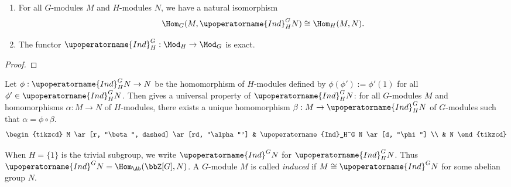   \begin{lemma}
    \begin{enumerate}
      \item For all $G$-modules $M$ and $H$-modules $N$, we have a natural isomorphism
      \[ \Hom_{G}(M, \upoperatorname{Ind}_H^G N) \cong \Hom_{H}(M, N). \]
      \item The functor $\upoperatorname{Ind}_H^G: \Mod_H \to \Mod_G$ is exact.
    \end{enumerate}
  \end{lemma}
  \begin{proof}

  \end{proof}

  Let $\phi: \upoperatorname{Ind}_H^G N \to N$ be the homomorphism of $H$-modules defined by $\phi(\phi') := \phi'(1)$ for all $\phi' \in \upoperatorname{Ind}_H^G N$.
  Then  gives a universal property of $\upoperatorname{Ind}_H^G N$: for all $G$-modules $M$ and homomorphisms $\alpha: M \to N$ of $H$-modules, there exists a unique homomorphism $\beta: M \to \upoperatorname{Ind}_H^G N$ of $G$-modules such that $\alpha = \phi \circ \beta$.
  \[ \begin{tikzcd}
    M \ar[r, "\beta", dashed] \ar[rd, "\alpha"'] & \upoperatorname{Ind}_H^G N \ar[d, "\phi"] \\
    & N
  \end{tikzcd} \]

  When $H = \{1\}$ is the trivial subgroup, we write $\upoperatorname{Ind}^G N$ for $\upoperatorname{Ind}_H^G N$.
  Thus $\upoperatorname{Ind}^G N = \Hom_{\Ab}(\bbZ[G], N)$.
  A $G$-module $M$ is called \emph{induced} if $M \cong \upoperatorname{Ind}^G N$ for some abelian group $N$.


  
